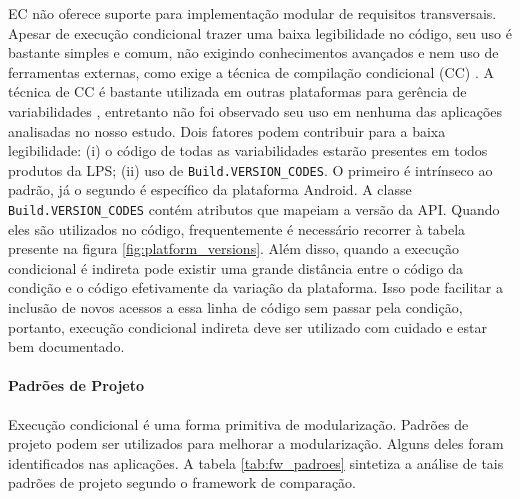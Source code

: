 EC não oferece suporte para implementação modular de requisitos transversais.
Apesar de execução condicional trazer uma baixa legibilidade no código, seu uso
é bastante simples e comum, não exigindo conhecimentos avançados e nem uso de
ferramentas externas, como exige a técnica de compilação condicional (CC) %
\cite{Medeiros2015}. A técnica de CC é bastante utilizada em outras plataformas
para gerência de variabilidades \cite{Liebig2010}, entretanto não foi observado
seu uso em nenhuma das aplicações analisadas no nosso estudo. Dois fatores podem
contribuir para a baixa legibilidade: (i) o código de todas as variabilidades
estarão presentes em todos produtos da LPS; (ii) uso de \texttt{Build.VERSION\_CODES}.
O primeiro é intrínseco ao padrão, já o segundo é específico da plataforma Android.
A classe \texttt{Build.VERSION\_CODES} contém atributos que mapeiam a versão da API.
Quando eles são utilizados no código, frequentemente é necessário recorrer à tabela
presente na figura \ref{fig:platform_versions}. Além disso, quando a execução
condicional é indireta pode existir uma grande distância entre o código da condição
e o código efetivamente da variação da plataforma. Isso pode facilitar a inclusão de
novos acessos a essa linha de código sem passar pela condição, portanto, execução
condicional indireta deve ser utilizado com cuidado e estar bem documentado.

\paragraph{Padrões de Projeto}
Execução condicional é uma forma primitiva de modularização. Padrões de projeto
podem ser utilizados para melhorar a modularização. Alguns deles foram identificados
nas aplicações. A tabela \ref{tab:fw_padroes} sintetiza a análise de tais padrões de
projeto segundo o framework de comparação.

